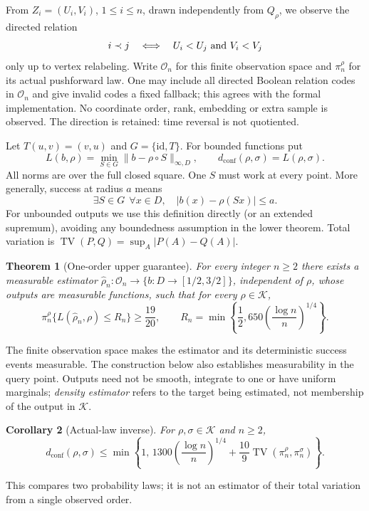 \documentclass[11pt]{article}
\newtheorem{theorem}{Theorem}[section]
\newtheorem{corollary}[theorem]{Corollary}
\theoremstyle{remark}
\newcommand{\K}{\mathcal K}
\newcommand{\TV}{\operatorname{TV}}
\newcommand{\dc}{d_{\mathrm{conf}}}
\newcommand{\norm}[1]{\lVert #1\rVert_{\infty,D}}
\begin{document}
From $Z_i=(U_i,V_i)$, $1\le i\le n$, drawn independently from $Q_\rho$,
we observe the directed relation
\[
 i\prec j\quad\Longleftrightarrow\quad U_i<U_j\ \hbox{and}\ V_i<V_j
\]
only up to vertex relabeling. Write $\mathcal O_n$ for this finite
observation space and $\pi_n^\rho$ for its actual pushforward law.
One may include all directed Boolean relation codes in $\mathcal O_n$
and give invalid codes a fixed fallback; this agrees with the formal
implementation. No coordinate order, rank, embedding or extra sample
is observed. The direction is retained: time reversal is not quotiented.

Let $T(u,v)=(v,u)$ and $G=\{\mathrm{id},T\}$. For bounded functions put
\[
 L(b,\rho)=\min_{S\in G}\norm{b-\rho\circ S},\qquad
 \dc(\rho,\sigma)=L(\rho,\sigma).
\]
All norms are over the full closed square. One $S$ must work at every
point. More generally, success at radius $a$ means
\begin{equation}\label{eq:success}
 \exists S\in G\ \ \forall x\in D,\quad |b(x)-\rho(Sx)|\le a.
\end{equation}
For unbounded outputs we use this definition directly (or an extended
supremum), avoiding any boundedness assumption in the lower theorem.
Total variation is $\TV(P,Q)=\sup_A|P(A)-Q(A)|$.

\begin{theorem}[One-order upper guarantee]\label{thm:upper}
For every integer $n\ge2$ there exists a measurable estimator
$\widehat\rho_n:\mathcal O_n\to\{b:D\to[1/2,3/2]\}$, independent of
$\rho$, whose outputs are measurable functions, such that for every
$\rho\in\K$,
\begin{equation}\label{eq:upper}
 \pi_n^\rho\{L(\widehat\rho_n,\rho)\le R_n\}\ge\frac{19}{20},
 \qquad R_n=\min\left\{\frac12,650\left(\frac{\log n}{n}\right)^{1/4}\right\}.
\end{equation}
\end{theorem}
The finite observation space makes the estimator and its deterministic
success events measurable. The construction below also establishes
measurability in the query point. Outputs need not be smooth, integrate
to one or have uniform marginals; \emph{density estimator} refers to the
target being estimated, not membership of the output in $\K$.

\begin{corollary}[Actual-law inverse]\label{cor:law}
For $\rho,\sigma\in\K$ and $n\ge2$,
\begin{equation}\label{eq:law}
 \dc(\rho,\sigma)\le
 \min\left\{1,\,
 1300\left(\frac{\log n}{n}\right)^{1/4}
       +\frac{10}{9}\TV(\pi_n^\rho,\pi_n^\sigma)\right\}.
\end{equation}
\end{corollary}
This compares two probability laws; it is not an estimator of their
total variation from a single observed order.
\end{document}
